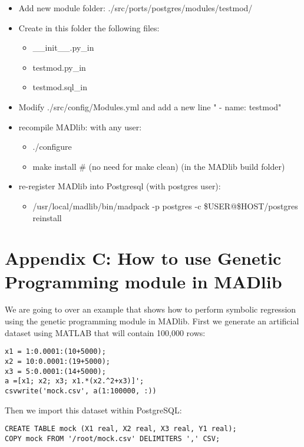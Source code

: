 \begin{itemize}
  \item Add new module folder: ./src/ports/postgres/modules/testmod/
  \item Create in this folder the following files:

\begin{itemize}
  \item \_\_init\_\_.py\_in  
  \item testmod.py\_in
  \item testmod.sql\_in
\end{itemize}

\item Modify ./src/config/Modules.yml and add a new line "	- name: testmod"
  \item recompile MADlib: with any user:

\begin{itemize}
  \item ./configure
  \item make install      \# (no need for make clean) (in the MADlib build folder)
\end{itemize}
  \item re-register MADlib into Postgresql (with postgres user):
  \begin{itemize}
  \item  /usr/local/madlib/bin/madpack -p postgres -c \$USER@\$HOST/postgres reinstall
  \end{itemize}
 \end{itemize}
 


\section*{Appendix C: How to use Genetic Programming module in MADlib}

We are going to over an example that shows how to perform symbolic regression using the genetic programming module in MADlib. First we generate an artificial dataset using MATLAB that will contain 100,000 rows:

\begin{verbatim}
x1 = 1:0.0001:(10+5000);
x2 = 10:0.0001:(19+5000);
x3 = 5:0.0001:(14+5000);
a =[x1; x2; x3; x1.*(x2.^2+x3)]';
csvwrite('mock.csv', a(1:100000, :))
\end{verbatim}

{\raggedleft Then we import this dataset within PostgreSQL:}
\begin{verbatim}
CREATE TABLE mock (X1 real, X2 real, X3 real, Y1 real);
COPY mock FROM '/root/mock.csv' DELIMITERS ',' CSV;
\end{verbatim}

